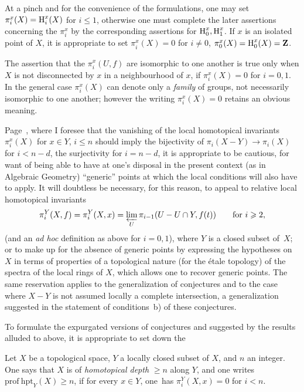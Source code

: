 At a pinch and for the convenience of the formulations, one may set $\pi_i^x(X)=\operatorname{H}_i^x(X)$ for $i\leq 1$, otherwise one must complete the later assertions concerning the $\pi_i^x$ by the corresponding assertions for $\operatorname{H}_0^x, \operatorname{H}_1^x$. If $x$ is an isolated point of $X$, it is appropriate to set $\pi_i^x(X)=0$ for $i\neq 0$, $\pi_0^x(X)=\operatorname{H}_0^x(X)=\mathbf{Z}$.

The assertion that the $\pi_i^x(U, f)$ are isomorphic to one another is true only when $X$ is not disconnected by $x$ in a neighbourhood of $x$, \ie if $\pi_i^x(X)=0$ for $i=0, 1$. In the general case $\pi_i^x(X)$ can denote only a \emph{family} of groups, not necessarily isomorphic to one another; however the writing $\pi_i^x(X)=0$ retains an obvious meaning.

\label{p26y}Page~\pageref{p15l}, where I foresee that the vanishing of the local homotopical invariants $\pi_i^x(X)$ for $x\in Y$, $i\leq n$ should imply the bijectivity of $\pi_i(X-Y)\to\pi_i(X)$ for $i<n-d$, the surjectivity for $i=n-d$, it is appropriate to be cautious, for want of being able to have at one's disposal in the present context (as in Algebraic Geometry) ``generic'' points at which the local conditions will also have to apply. It will doubtless be necessary, for this reason, to appeal to relative local homotopical invariants
$$
\pi_i^Y(X, f)=\pi_i^Y(X, x)=\varprojlim_U \pi_{i-1}(U-U\cap Y, f(t))\qquad\text{for }i\geqslant 2,
$$
(and an {\textit{ad hoc}} definition as above for $i=0, 1$), where $Y$ is a closed subset of~$X$; or to make up for the absence of generic points by expressing the hypotheses on $X$ in terms of properties of a topological nature (for the \'etale topology) of the spectra of the local rings of $X$, which allows one to recover generic points. The same reservation applies to the generalization of conjectures  and  to the case where $X-Y$ is not assumed locally a complete intersection, a generalization suggested in the statement of conditions~b) of these conjectures.

To formulate the expurgated versions of conjectures  and  suggested by the results alluded to above, it is appropriate to set down the

\begin{supdefinition} \label{XIII.6.1} Let $X$ be a topological space, $Y$ a locally closed subset of $X$, and $n$ an integer. One says that $X$ is of \emph{homotopical depth} $\geq n$ along $Y$, and one writes $\mathrm{prof\:hpt}_Y(X)\geq n$, if for every $x\in Y$, one~has $\pi_i^Y(X, x)=0$ for $i<n$.
\end{supdefinition}

